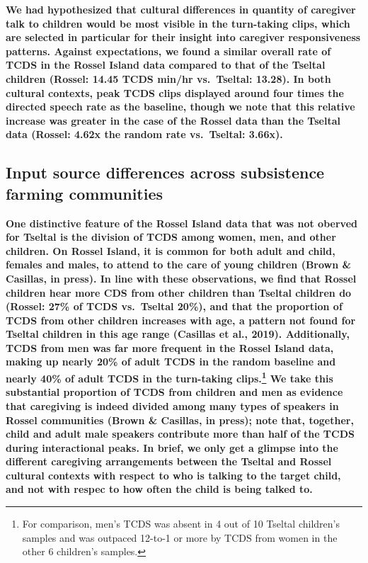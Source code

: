 \documentclass[,man,floatsintext]{apa6}
\begin{document}
\textbf{We had hypothesized that cultural differences in quantity of
caregiver talk to children would be most visible in the turn-taking
clips, which are selected in particular for their insight into caregiver
responsiveness patterns. Against expectations, we found a similar
overall rate of TCDS in the Rossel Island data compared to that of the
Tseltal children (Rossel: 14.45 TCDS min/hr vs.~Tseltal: 13.28). In both
cultural contexts, peak TCDS clips displayed around four times the
directed speech rate as the baseline, though we note that this relative
increase was greater in the case of the Rossel data than the Tseltal
data (Rossel: 4.62x the random rate vs.~Tseltal: 3.66x).}

\subsection{\texorpdfstring{\textbf{Input source differences across
subsistence farming
communities}}{Input source differences across subsistence farming communities}}\label{input-source-differences-across-subsistence-farming-communities}

\textbf{One distinctive feature of the Rossel Island data that was not
oberved for Tseltal is the division of TCDS among women, men, and other
children. On Rossel Island, it is common for both adult and child,
females and males, to attend to the care of young children (Brown \&
Casillas, in press). In line with these observations, we find that
Rossel children hear more CDS from other children than Tseltal children
do (Rossel: 27\% of TCDS vs.~Tseltal 20\%), and that the proportion of
TCDS from other children increases with age, a pattern not found for
Tseltal children in this age range (Casillas et al., 2019).
Additionally, TCDS from men was far more frequent in the Rossel Island
data, making up nearly 20\% of adult TCDS in the random baseline and
nearly 40\% of adult TCDS in the turn-taking clips.\footnote{For
  comparison, men's TCDS was absent in 4 out of 10 Tseltal children's
  samples and was outpaced 12-to-1 or more by TCDS from women in the
  other 6 children's samples.} We take this substantial proportion of
TCDS from children and men as evidence that caregiving is indeed divided
among many types of speakers in Rossel communities (Brown \& Casillas,
in press); note that, together, child and adult male speakers contribute
more than half of the TCDS during interactional peaks. In brief, we only
get a glimpse into the different caregiving arrangements between the
Tseltal and Rossel cultural contexts with respect to who is talking to
the target child, and not with respec to how often the child is being
talked to.}
\end{document}
